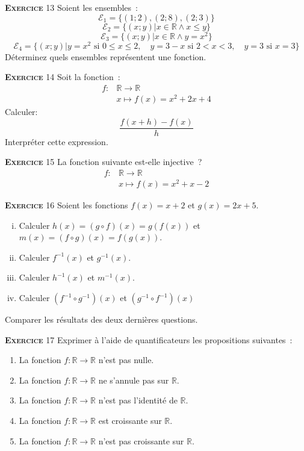 \documentclass[10pt,a4paper,notitlepage]{article}
\newcommand{\exercice}[1]{\textsc{\textbf{Exercice}} #1}
\begin{document}
\bigskip

\exercice{13} Soient les ensembles~:
\[
\mathcal E_1 = \{(1;2), (2;8), (2;3)\}
\]
\[
\mathcal E_2 = \{ (x;y) | x \in \mathbb R \land x\leq y \}
\]
\[
\mathcal E_3 = \{ (x;y) | x \in \mathbb R \land y = x^2 \}
\]
\[
\mathcal E_4 = \{ (x;y) | y = x^2 \text{ si } 0\leq x\leq 2,\quad
y=3-x  \text{ si } 2<x<3, \quad y=3 \text{ si } x=3\}
\]
Déterminez quels ensembles représentent une fonction.

\bigskip

\exercice{14} Soit la fonction~:
\[
\begin{split}
  f: &\mathbb R \rightarrow \mathbb R\\
  &x \mapsto f(x) = x^2 + 2x + 4
\end{split}
\]
Calculer:
\[
\frac{f(x+h)-f(x)}{h}
\]
Interpréter cette expression.

\bigskip

\exercice{15} La fonction suivante est-elle injective ?
\[
\begin{split}
  f: &\mathbb R \rightarrow \mathbb R\\
  &x \mapsto f(x) = x^2 + x - 2
\end{split}
\]

\bigskip

\exercice{16} Soient les fonctions $f(x) = x+2$ et $g(x) = 2x + 5$.
\begin{enumerate}[(i)]
\item Calculer $h(x) = (g \circ f)(x) = g\left(f(x)\right)$ et $m(x) = (f \circ g)(x) = f\left(g(x)\right)$.
\item Calculer $f^{-1}(x)$ et $g^{-1}(x)$.
\item Calculer $h^{-1}(x)$ et $m^{-1}(x)$.
\item Calculer $\left(f^{-1} \circ g^{-1}\right)(x)$ et $\left(g^{-1} \circ f^{-1}\right)(x)$
\end{enumerate}
Comparer les résultats des deux dernières questions.

\bigskip

\exercice{17} Exprimer à l'aide de quantificateurs les propositions
suivantes~:
\begin{enumerate}
\item La fonction $f: \mathbb R \rightarrow \mathbb R$ n'est pas
  nulle.
\item La fonction $f: \mathbb R \rightarrow \mathbb R$ ne s'annule pas
sur $\mathbb R$.
\item La fonction $f: \mathbb R \rightarrow \mathbb R$ n'est pas
  l'identité de $\mathbb R$.
\item La fonction $f: \mathbb R \rightarrow \mathbb R$ est croissante
  sur $\mathbb R$.
\item La fonction $f: \mathbb R \rightarrow \mathbb R$ n'est pas croissante
  sur $\mathbb R$.
\end{enumerate}
\end{document}
